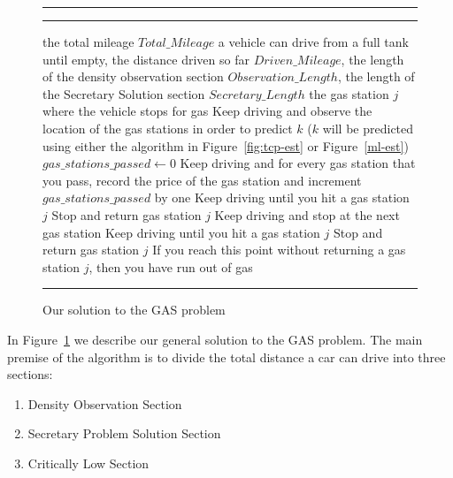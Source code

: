 \begin{figure}[!hbt]
\vspace{0.2cm}
\hrule \medskip {} \smallskip
\hrule
\smallskip
\begin{algorithmic}[1]
 the total mileage $Total\_Mileage$ a vehicle can drive from a full tank until empty, the distance driven so far $Driven\_Mileage$, the length of the density observation section $Observation\_Length$, the length of the Secretary Solution section $Secretary\_Length$
 the gas station $j$ where the vehicle stops for gas
\STATE Keep driving and observe the location of the gas stations in order to predict $k$ ($k$ will be predicted using either the algorithm in Figure~\ref{fig:tcp-est} or Figure~\ref{ml-est})
\ENDWHILE \\
$gas\_stations\_passed \gets 0$
\STATE Keep driving and for every gas station that you pass, record the price of the gas station and increment $gas\_stations\_passed$ by one
\ENDWHILE
{}
\STATE Keep driving until you hit a gas station $j$
\STATE Stop and return gas station $j$
\ELSE
\STATE Keep driving and stop at the next gas station
\ENDIF
\ENDWHILE
{}
\STATE Keep driving until you hit a gas station $j$
\STATE Stop and return gas station $j$
\ENDWHILE
\STATE If you reach this point without returning a gas station $j$, then you have run out of gas
\end{algorithmic}
\hrule
\caption{Our solution to the GAS problem}
\label{fig:CriticalSectionsAlg}
\end{figure}

In Figure~\ref{fig:CriticalSectionsAlg} we describe our general solution to the GAS problem. The main premise of the algorithm is to divide the total distance a car can drive into three sections:
\begin{enumerate}
\item Density Observation Section
\item Secretary Problem Solution Section
\item Critically Low Section
\end{enumerate}

